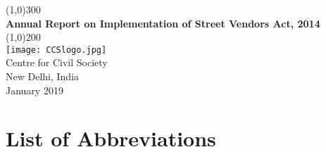 \documentclass[a4paper, 12pt, twoside]{article}
\begin{document}
                    

\newpage

\begin{titlepage}
\begin{center}
\line(1,0){300}\\
[0.25in]
\huge{\bfseries \textcolor{CCSbrown} {Annual Report on Implementation of Street Vendors Act, 2014}} \\
[0.5cm]
    	
\line(1,0){200}\\
[2in]
\texttt{[image: CCSlogo.jpg]} \\
[1.5cm]
\LARGE{Centre for Civil Society} \\ 
[1.5cm]
{\Large New Delhi, India} \\
{\Large January 2019} \\
[1.85cm]


\end{center}
\end{titlepage}


\tableofcontents   

\newpage
{}

\section*{List of Abbreviations}
        
\end{document}

